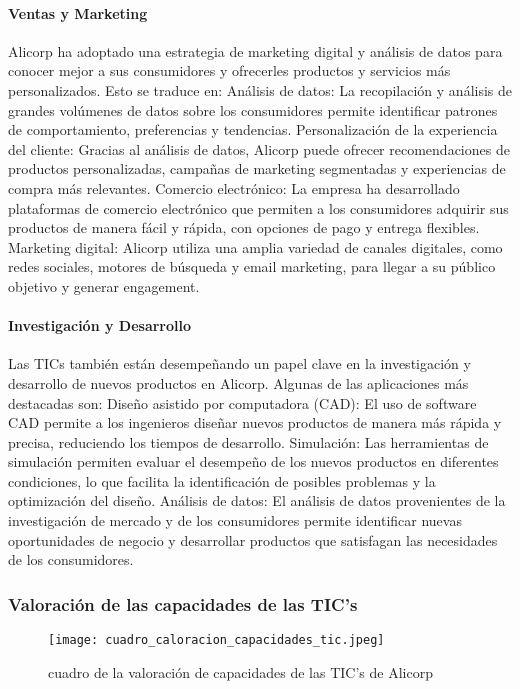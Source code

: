         \paragraph*{Ventas y Marketing} 
        Alicorp ha adoptado una estrategia de marketing digital y análisis de datos para conocer mejor a sus consumidores y ofrecerles productos y servicios más personalizados. Esto se traduce en: 
        Análisis de datos: La recopilación y análisis de grandes volúmenes de datos sobre los consumidores permite identificar patrones de comportamiento, preferencias y tendencias. 
        Personalización de la experiencia del cliente: Gracias al análisis de datos, Alicorp puede ofrecer recomendaciones de productos personalizadas, campañas de marketing segmentadas y experiencias de compra más relevantes. 
        Comercio electrónico: La empresa ha desarrollado plataformas de comercio electrónico que permiten a los consumidores adquirir sus productos de manera fácil y rápida, con opciones de pago y entrega flexibles. 
        Marketing digital: Alicorp utiliza una amplia variedad de canales digitales, como redes sociales, motores de búsqueda y email marketing, para llegar a su público objetivo y generar engagement. 
    
        \paragraph*{Investigación y Desarrollo}
        Las TICs también están desempeñando un papel clave en la investigación y desarrollo de nuevos productos en Alicorp. Algunas de las aplicaciones más destacadas son: 
        Diseño asistido por computadora (CAD): El uso de software CAD permite a los ingenieros diseñar nuevos productos de manera más rápida y precisa, reduciendo los tiempos de desarrollo. 
        Simulación: Las herramientas de simulación permiten evaluar el desempeño de los nuevos productos en diferentes condiciones, lo que facilita la identificación de posibles problemas y la optimización del diseño. 
        Análisis de datos: El análisis de datos provenientes de la investigación de mercado y de los consumidores permite identificar nuevas oportunidades de negocio y desarrollar productos que satisfagan las necesidades de los consumidores. 

    \subsubsection{Valoración de las capacidades de las TIC’s }
    \begin{figure}[!ht]
        \centering
        \texttt{[image: cuadro\_caloracion\_capacidades\_tic.jpeg]}
        \caption{cuadro de la valoración de capacidades de las TIC's de Alicorp}
    \end{figure}


